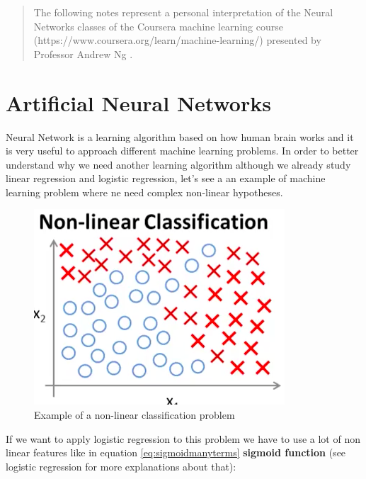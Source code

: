 
\begin{quotation}
\begin{itshape}
The following notes represent a personal interpretation of the Neural Networks classes of the Coursera machine learning course (https://www.coursera.org/learn/machine-learning/) presented by Professor Andrew Ng . 
\end{itshape}
\end{quotation}

\newpage

\section{Artificial Neural Networks} %
\label{ANN}

Neural Network is a learning algorithm based on how human brain works and it is very useful to approach different machine learning problems.
In order to better understand why we need another learning algorithm although we already study linear regression and logistic regression, let's see a an example of machine learning problem where ne need complex non-linear hypotheses.


\begin{figure}[H]
\begin{center}
\includegraphics[scale=0.35]{images/non-linear-class}
\end{center}
\caption{Example of a non-linear classification problem} 
\label{nn-linear-class}
\end{figure}


If we want to apply logistic regression to this problem we have to use a lot of non linear features like in equation \ref{eq:sigmoidmanyterms} {\bf sigmoid function} (see logistic regression for more explanations about that):


